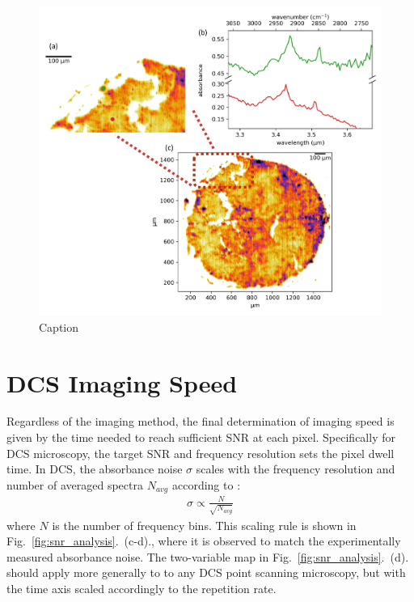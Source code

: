 \documentclass{optica-article}
\begin{document}
\begin{figure}[h]
    \centering
    \includegraphics[width=\linewidth]{bio_image.png}
    \caption{Caption}
    \label{fig:bio}
\end{figure}

\section{DCS Imaging Speed}
Regardless of the imaging method, the final determination of imaging speed is given by the time needed to reach sufficient SNR at each pixel. Specifically for DCS microscopy, the target SNR and frequency resolution sets the pixel dwell time. In DCS, the absorbance noise $\sigma$ scales with the frequency resolution and number of averaged spectra $N_{avg}$ according to \cite{newbury_sensitivity_2010}: 
% 
\begin{align}
    \sigma \propto \frac{N}{\sqrt{N_{avg}}}
    \label{eq:snr}
\end{align}
% 
where $N$ is the number of frequency bins. This scaling rule is shown in Fig.~\ref{fig:snr_analysis}.~(c-d)., where it is observed to match the experimentally measured absorbance noise. The two-variable map in  Fig.~\ref{fig:snr_analysis}.~(d). should apply more generally to to any DCS point scanning microscopy, but with the time axis scaled accordingly to the repetition rate. 
\end{document}
